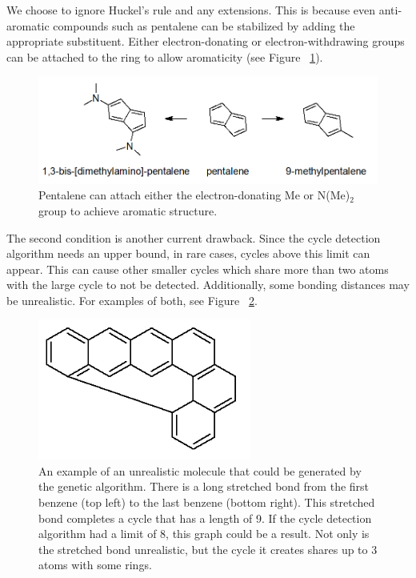 \documentclass[12pt]{article}
\begin{document}
We choose to ignore Huckel's rule and any extensions. This is because even anti-aromatic compounds such as pentalene can be stabilized by adding the appropriate substituent. Either electron-donating or electron-withdrawing groups can be attached to the ring to allow aromaticity (see Figure ~\ref{fig:pentalene}). 

\begin{figure}[ht!]
\centering
\includegraphics[width=160mm]{pentalene.png}
\caption{Pentalene can attach either the electron-donating Me \cite{methylPentalene} or N(Me)$_2$ \cite{nitrogenPentalene} group to achieve aromatic structure.}
\label{fig:pentalene}
\end{figure}

The second condition is another current drawback. Since the cycle detection algorithm needs an upper bound, in rare cases, cycles above this limit can appear. This can cause other smaller cycles which share more than two atoms with the large cycle to not be detected. Additionally, some bonding distances may be unrealistic. For examples of both, see Figure ~\ref{fig:unrealistic}.

\begin{figure}[ht!]
\centering
\includegraphics[width=70mm]{unrealistic.png}
\caption{An example of an unrealistic molecule that could be generated by the genetic algorithm. There is a long stretched bond from the first benzene (top left) to the last benzene (bottom right). This stretched bond completes a cycle that has a length of 9. If the cycle detection algorithm had a limit of 8, this graph could be a result. Not only is the stretched bond unrealistic, but the cycle it creates shares up to 3 atoms with some rings.}
\label{fig:unrealistic}
\end{figure}
 
\end{document}
